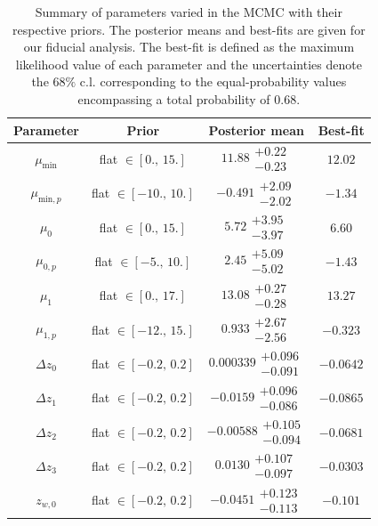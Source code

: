 \documentclass[a4paper,11pt]{article}
\newcommand\Tstrut{\rule{0pt}{3ex}}
\begin{document}
    \begin{table}
      \caption{Summary of parameters varied in the MCMC with their respective priors. The posterior means and best-fits are given for our fiducial analysis. The best-fit is defined as the maximum likelihood value of each parameter and the uncertainties denote the $68 \%$ c.l. corresponding to the equal-probability values encompassing a total probability of 0.68.} \label{tab:params}
      \begin{center}
        \begin{tabular}{cccc}
          \hline\hline 
          Parameter & Prior & Posterior mean & Best-fit \\ \hline \Tstrut                             
          $\mu_{\mathrm{min}}$ & flat $\in [0., \,15.]$ & $11.88\substack{+0.22 \\ -0.23}$ & $12.02$ \\ 
          $\mu_{\mathrm{min}, p}$ & flat $\in [-10., \,10.]$ & $-0.491\substack{+2.09 \\ -2.02}$ & $-1.34$ \\
          $\mu_{0}$ & flat $\in [0., \,15.]$ & $5.72\substack{+3.95 \\ -3.97}$ & $6.60$ \\
          $\mu_{0, p}$ & flat $\in [-5., \,10.]$ & $2.45\substack{+5.09 \\ -5.02}$ & $-1.43$ \\
          $\mu_{1}$ & flat $\in [0., \,17.]$ & $13.08\substack{+0.27 \\ -0.28}$ & $13.27$ \\ 
          $\mu_{1, p}$ & flat $\in [-12., \,15.]$ & $0.933\substack{+2.67 \\ -2.56}$ & $-0.323$ \\
          $\Delta z_{0}$ & flat $\in [-0.2, \,0.2]$ & $0.000339\substack{+0.096 \\ -0.091}$ & $-0.0642$ \\
          $\Delta z_{1}$ & flat $\in [-0.2, \,0.2]$ & $-0.0159\substack{+0.096 \\ -0.086}$ & $-0.0865$ \\
          $\Delta z_{2}$ & flat $\in [-0.2, \,0.2]$ & $-0.00588\substack{+0.105 \\ -0.094}$ & $-0.0681$ \\
          $\Delta z_{3}$ & flat $\in [-0.2, \,0.2]$ & $0.0130\substack{+0.107 \\ -0.097}$ & $-0.0303$ \\
          $z_{w, 0}$ & flat $\in [-0.2, \,0.2]$ & $-0.0451\substack{+0.123 \\ -0.113}$ & $-0.101$ \\

\end{tabular}
\end{center}
\end{table}
\end{document}
